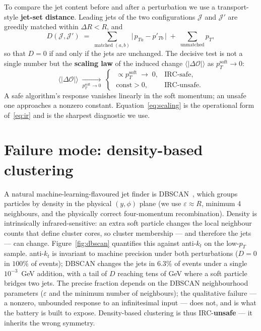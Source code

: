 \documentclass[11pt]{article}
\newcommand{\kt}{k_{t}}
\newcommand{\antikt}{anti-$\kt$}
\newcommand{\pt}{p_{T}}
\newcommand{\ptsoft}{p_{T}^{\mathrm{soft}}}
\newcommand{\dR}{\Delta R}
\newcommand{\Obs}{\mathcal{O}}
\newcommand{\unsafe}{\textcolor{BrickRed}{\textbf{unsafe}}}
\begin{document}
To compare the jet content before and after a perturbation we use a transport-style
\textbf{jet-set distance}. Leading jets of the two configurations $\mathcal{J}$ and
$\mathcal{J}'$ are greedily matched within $\dR<R$, and
\begin{equation}
D(\mathcal{J},\mathcal{J}') \;=\;
\sum_{\text{matched }(a,b)} \big|\,p_{Ta}-p'_{Tb}\,\big|
\;+\; \sum_{\text{unmatched}} p_T ,
\label{eq:D}
\end{equation}
so that $D=0$ if and only if the jets are unchanged. The decisive test is not a single
number but the \textbf{scaling law} of the induced change $\langle|\Delta\Obs|\rangle$ as
$\ptsoft\to0$:
\begin{equation}
\big\langle|\Delta\Obs|\big\rangle \;\xrightarrow[\ptsoft\to0]{}\;
\begin{cases}
\;\propto \ptsoft \;\longrightarrow\; 0, & \text{IRC-safe},\\[2pt]
\;\text{const} > 0, & \text{IRC-unsafe}.
\end{cases}
\label{eq:scaling}
\end{equation}
A safe algorithm's response vanishes linearly in the soft momentum; an unsafe one approaches
a nonzero constant. Equation~\eqref{eq:scaling} is the operational form of~\eqref{eq:ir} and
is the sharpest diagnostic we use.

\section{Failure mode: density-based clustering}
A natural machine-learning-flavoured jet finder is DBSCAN~\cite{dbscan}, which groups
particles by density in the physical $(y,\phi)$ plane (we use $\varepsilon\approx R$,
minimum 4 neighbours, and the physically correct four-momentum recombination). Density is
intrinsically infrared-sensitive: an extra soft particle changes the local neighbour counts
that define cluster cores, so cluster membership --- and therefore the jets --- can change.
Figure~\ref{fig:dbscan} quantifies this against \antikt{} on the low-$\pt$ sample.
\antikt{} is invariant to machine precision under both perturbations ($D=0$ in $100\%$ of
events); DBSCAN changes the jets in $\mathbf{6.3\%}$ of events under a single $10^{-3}$~GeV
addition, with a tail of $D$ reaching tens of GeV where a soft particle bridges two jets.
The precise fraction depends on the DBSCAN neighbourhood parameters ($\varepsilon$ and the
minimum number of neighbours); the qualitative failure --- a nonzero, unbounded response to
an infinitesimal input --- does not, and is what the battery is built to expose.
Density-based clustering is thus IRC-\unsafe{} --- it inherits the wrong symmetry.
\end{document}
